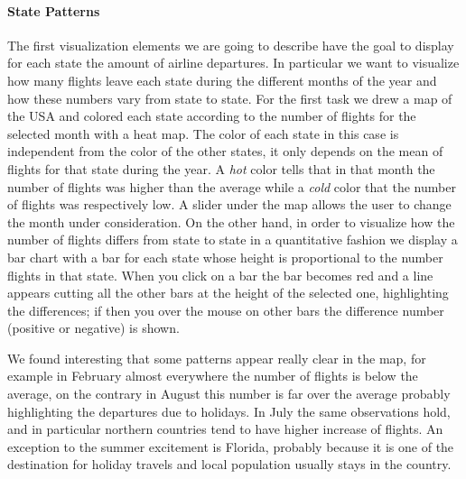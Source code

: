 \documentclass[a4paper, 12pt]{article}
\begin{document}
\paragraph*{State Patterns}
The first visualization elements we are going to describe have the goal to display for each state the 
amount of airline departures. In particular we want to visualize how many flights leave each state during
the different months of the year and how these numbers vary from state to state. For the first task we
drew a map of the USA and colored each state according to the number of flights for the selected month
with a heat map. The color of each state in this case is independent from the color of the other states,
it only depends on the mean of flights for that state during the year. A \emph{hot} color tells that in
that month the number of flights was higher than the average while a \emph{cold} color that the number of
flights was respectively low. A slider under the map allows the user to change the month under
consideration. On the other hand, in order to visualize how the number of flights differs from state to 
state in a quantitative fashion we display a bar chart with a bar for each state whose height is
proportional to the number flights in that state. When you click on a bar the bar becomes red and a line
appears cutting all the other bars at the height of the selected one, highlighting the differences; if 
then you over the mouse on other bars the difference number (positive or negative) is shown.

We found interesting that some patterns appear really clear in the map, for example in February almost
everywhere the number of flights is below the average, on the contrary in August this number is far over
the average probably highlighting the departures due to holidays. In July the same observations hold, and 
in particular northern countries tend to have higher increase of flights. An exception to the summer 
excitement is Florida, probably because it is one of the destination for holiday travels and local
population usually stays in the country.
\end{document}

